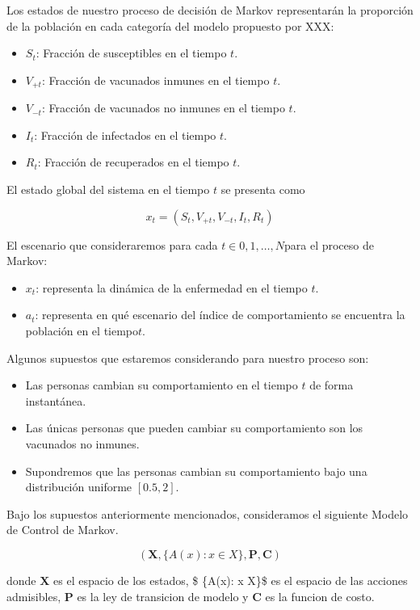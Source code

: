 \documentclass[
  letterpaper,
  DIV=11,
  numbers=noendperiod]{scrreprt}
\providecommand{\tightlist}{%
  \setlength{\itemsep}{0pt}\setlength{\parskip}{0pt}}\usepackage{longtable,booktabs,array}
\begin{document}
Los estados de nuestro proceso de decisión de Markov representarán la
proporción de la población en cada categoría del modelo propuesto por
XXX:

\begin{itemize}
\item
  \(S_{t}\): Fracción de susceptibles en el tiempo \(t\).
\item
  \(V_{+t}\): Fracción de vacunados inmunes en el tiempo \(t\).
\item
  \(V_{-t}\): Fracción de vacunados no inmunes en el tiempo \(t\).
\item
  \(I_{t}\): Fracción de infectados en el tiempo \(t\).
\item
  \(R_{t}\): Fracción de recuperados en el tiempo \(t\).
\end{itemize}

El estado global del sistema en el tiempo \(t\) se presenta como

\[
x_{t} = (S_{t}, V_{+t}, V_{-t}, I_{t}, R_{t})
\]

El escenario que consideraremos para cada \(t \in {0,1,\dots, N}\)para
el proceso de Markov:

\begin{itemize}
\tightlist
\item
  \(x_{t}\): representa la dinámica de la enfermedad en el tiempo \(t\).
\item
  \(a_{t}\): representa en qué escenario del índice de comportamiento se
  encuentra la población en el tiempo\(t\).
\end{itemize}

Algunos supuestos que estaremos considerando para nuestro proceso son:

\begin{itemize}
\tightlist
\item
  Las personas cambian su comportamiento en el tiempo \(t\) de forma
  instantánea.
\item
  Las únicas personas que pueden cambiar su comportamiento son los
  vacunados no inmunes.
\item
  Supondremos que las personas cambian su comportamiento bajo una
  distribución uniforme \([0.5, 2]\).
\end{itemize}

Bajo los supuestos anteriormente mencionados, consideramos el siguiente
Modelo de Control de Markov.

\[
(\mathbf{X},  \{A(x): x \in X\}, \mathbf{P}, \mathbf{C})
\]

donde \(\mathbf{X}\) es el espacio de los estados, \$ \{A(x): x
\in X\}\$ es el espacio de las acciones admisibles, \(\mathbf{P}\) es la
ley de transicion de modelo y \(\mathbf{C}\) es la funcion de costo.
\end{document}
